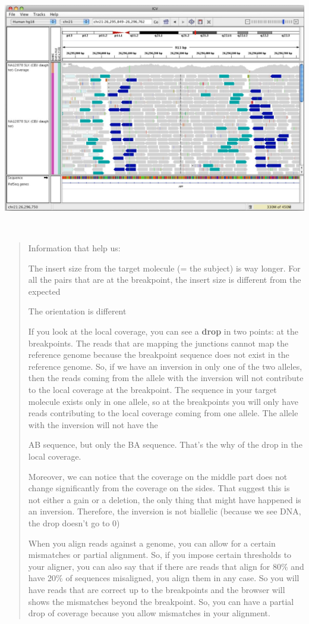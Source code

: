 \includegraphics[width=6.29861in,height=4.32833in]{image22.jpeg}

\begin{quote}
Information that help us:

The insert size from the target molecule (= the subject) is way longer.
For all the pairs that are at the breakpoint, the insert size is
different from the expected

The orientation is different

If you look at the local coverage, you can see a \textbf{drop} in two
points: at the breakpoints. The reads that are mapping the junctions
cannot map the reference genome because the breakpoint sequence does not
exist in the reference genome. So, if we have an inversion in only one
of the two alleles, then the reads coming from the allele with the
inversion will not contribute to the local coverage at the breakpoint.
The sequence in your target molecule exists only in one allele, so at
the breakpoints you will only have reads contributing to the local
coverage coming from one allele. The allele with the inversion will not
have the

AB sequence, but only the BA sequence. That's the why of the drop in the
local coverage.

Moreover, we can notice that the coverage on the middle part does not
change significantly from the coverage on the sides. That suggest this
is not either a gain or a deletion, the only thing that might have
happened is an inversion. Therefore, the inversion is not biallelic
(because we see DNA, the drop doesn't go to 0)

When you align reads against a genome, you can allow for a certain
mismatches or partial alignment. So, if you impose certain thresholds to
your aligner, you can also say that if there are reads that align for
80\% and have 20\% of sequences misaligned, you align them in any case.
So you will have reads that are correct up to the breakpoints and the
browser will shows the mismatches beyond the breakpoint. So, you can
have a partial drop of coverage because you allow mismatches in your
alignment.
\end{quote}

